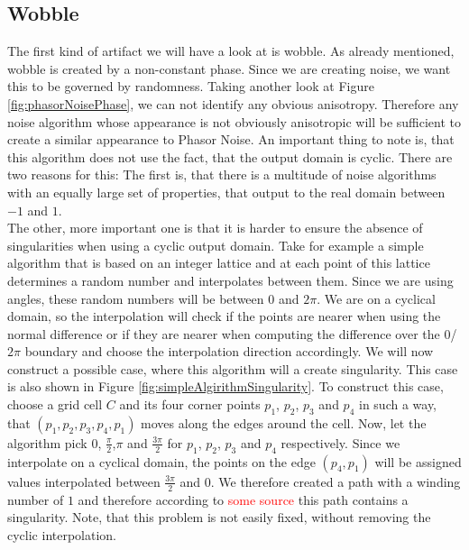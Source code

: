 \documentclass{utue} %
\begin{document}
\subsection{Wobble}\label{sec:wobble}
The first kind of artifact we will have a look at is wobble. As already mentioned, wobble is created by a non-constant phase. Since we are creating noise, we want this to be governed by randomness. Taking another look at Figure \ref{fig:phasorNoisePhase}, we can not identify any obvious anisotropy. Therefore any noise algorithm whose appearance is not obviously anisotropic will be sufficient to create a similar appearance to Phasor Noise. An important thing to note is, that this algorithm does not use the fact, that the output domain is cyclic. There are two reasons for this: The first is, that there is a multitude of noise algorithms with an equally large set of properties, that output to the real domain between $-1$ and $1$.\\
The other, more important one is that it is harder to ensure the absence of singularities when using a cyclic output domain. Take for example a simple algorithm that is based on an integer lattice and at each point of this lattice determines a random number and interpolates between them. Since we are using angles, these random numbers will be between $0$ and $2\pi$. We are on a cyclical domain, so the interpolation will check if the points are nearer when using the normal difference or if they are nearer when computing the difference over the $0$/$2\pi$ boundary and choose the interpolation direction accordingly. We will now construct a possible case, where this algorithm will a create singularity. This case is also shown in Figure \ref{fig:simpleAlgirithmSingularity}. To construct this case, choose a grid cell $C$ and its four corner points $p_1$, $p_2$, $p_3$ and $p_4$ in such a way, that $(p_1,p_2,p_3,p_4,p_1)$ moves along the edges around the cell. Now, let the algorithm pick $0$, $\frac{\pi}{2}$,$\pi$ and $\frac{3\pi}{2}$ for $p_1$, $p_2$, $p_3$ and $p_4$ respectively. Since we interpolate on a cyclical domain, the points on the edge $(p_4,p_1)$ will be assigned values interpolated between $\frac{3\pi}{2}$ and $0$. We therefore created a path with a winding number of $1$ and therefore according to \textcolor{red}{some source} this path contains a singularity. Note, that this problem is not easily fixed, without removing the cyclic interpolation.\\
\end{document}
